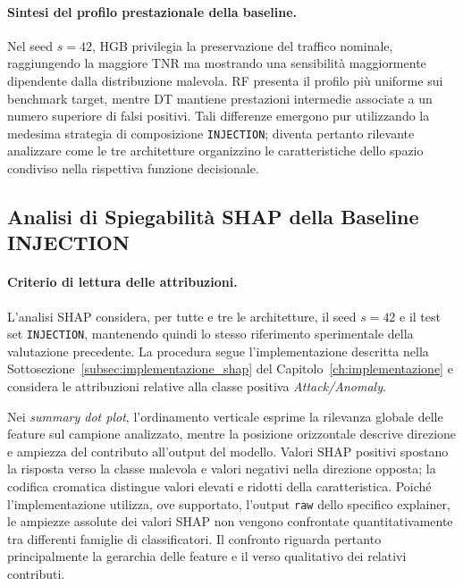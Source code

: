 \paragraph{Sintesi del profilo prestazionale della baseline.}
Nel seed $s=42$, HGB privilegia la preservazione del traffico nominale, raggiungendo la maggiore TNR ma mostrando una sensibilità maggiormente dipendente dalla distribuzione malevola. 
RF presenta il profilo più uniforme sui benchmark target, mentre DT mantiene prestazioni intermedie associate a un numero superiore di falsi positivi. 
Tali differenze emergono pur utilizzando la medesima strategia di composizione \texttt{INJECTION}; diventa pertanto rilevante analizzare come le tre architetture organizzino le caratteristiche dello spazio condiviso nella rispettiva funzione decisionale.



\subsection{Analisi di Spiegabilità SHAP della Baseline INJECTION}
\label{subsec:baseline_shap}

\paragraph{Criterio di lettura delle attribuzioni.}
L'analisi SHAP considera, per tutte e tre le architetture, il seed $s=42$ e il test set \texttt{INJECTION}, mantenendo quindi lo stesso riferimento sperimentale della valutazione precedente. 
La procedura segue l'implementazione descritta nella Sottosezione~\ref{subsec:implementazione_shap} del Capitolo~\ref{ch:implementazione} e considera le attribuzioni relative alla classe positiva \textit{Attack/Anomaly}.

Nei \textit{summary dot plot}, l'ordinamento verticale esprime la rilevanza globale delle feature sul campione analizzato, mentre la posizione orizzontale descrive direzione e ampiezza del contributo all'output del modello. 
Valori SHAP positivi spostano la risposta verso la classe malevola e valori negativi nella direzione opposta; la codifica cromatica distingue valori elevati e ridotti della caratteristica. 
Poiché l'implementazione utilizza, ove supportato, l'output \texttt{raw} dello specifico explainer, le ampiezze assolute dei valori SHAP non vengono confrontate quantitativamente tra differenti famiglie di classificatori. 
Il confronto riguarda pertanto principalmente la gerarchia delle feature e il verso qualitativo dei relativi contributi.


